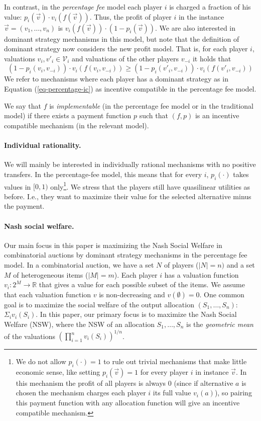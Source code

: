 \documentclass{article}
\begin{document}
In contrast, in the \emph{percentage fee} model each player $i$ is charged a fraction of his value: $p_i(\overrightarrow v)\cdot v_i(f(\overrightarrow v))$. Thus, the profit of player $i$ in the instance $\overrightarrow v=(v_1,\ldots, v_n)$ is $v_i(f(\overrightarrow v))\cdot (1-p_i(\overrightarrow v))$. We are also interested in dominant strategy mechanisms in this model, but note that the definition of dominant strategy now considers the new profit model. That is, for each player $i$, valuations $v_i,v'_i\in \mathcal V_i$ and valuations of the other players $v_{-i}$ it holds that
\begin{equation}\label{eq-percentage-ic}
(1-p_i(v_i,v_{-i}))\cdot v_i(f(v_i,v_{-i})) \geq (1-p_i(v'_i,v_{-i}))\cdot v_i(f(v'_i,v_{-i}))
\end{equation}
We refer to mechanisms where each player has a dominant strategy as in Equation (\ref{eq-percentage-ic}) as incentive compatible in the percentage fee model.

We say that $f$ is \emph{implementable} (in the percentage fee model or in the traditional model) if there exists a payment function $p$ such that $(f,p)$ is an incentive compatible mechanism (in the relevant model).

\paragraph{Individual rationality.} We will mainly be interested in individually rational mechanisms with no positive transfers. In the percentage-fee model, this means that for every $i$, $p_i(\cdot)$ takes values in $[0,1)$ only\footnote{We do not allow $p_i(\cdot)=1$ to rule out trivial mechanisms that make little economic sense, like setting $p_i(\vec v)=1$ for every player $i$ in instance $\vec{v}$. In this mechanism the profit of all players is always $0$ (since if alternative $a$ is chosen the mechanism charges each player $i$ its full value $v_i(a)$), so pairing this payment function with any allocation function will give an incentive compatible mechanism.}. We stress that the players still have quasilinear utilities as before. I.e., they want to maximize their value for the selected alternative minus the payment. 

\paragraph{Nash social welfare.} Our main focus in this paper is maximizing the Nash Social Welfare in combinatorial auctions by dominant strategy mechanisms in the percentage fee model. In a combinatorial auction, we have a set $N$ of players ($|N|=n)$ and a set $M$ of heterogeneous items ($|M|=m$). Each player $i$ has a valuation function $v_i:2^M\rightarrow \mathbb R$ that gives a value for each possible subset of the items. We assume that each valuation function $v$ is non-decreasing and $v(\emptyset)=0$. One common goal is to maximize the social welfare of the output allocation $(S_1,\ldots, S_n)$: $\Sigma_iv_i(S_i)$. In this paper, our primary focus is to maximize the Nash Social Welfare (NSW), where the NSW of an allocation $S_1,\ldots, S_n$ is the {\em geometric mean} of the valuations $(\prod_{i=1}^{n} v_i(S_i))^{1/n}$.
\end{document}
